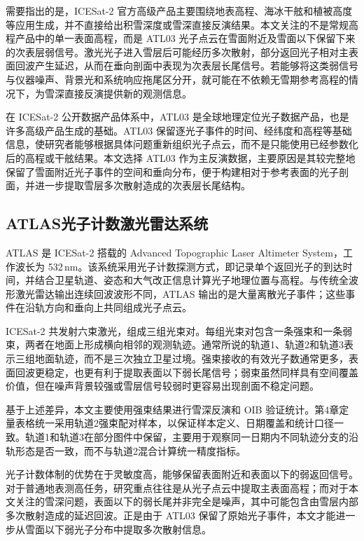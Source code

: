 需要指出的是，ICESat-2 官方高级产品主要围绕地表高程、海冰干舷和植被高度等应用生成，并不直接给出积雪深度或雪深直接反演结果。本文关注的不是常规高程产品中的单一表面高程，而是 ATL03 光子点云在雪面附近及雪面以下保留下来的次表层弱信号。激光光子进入雪层后可能经历多次散射，部分返回光子相对主表面回波产生延迟，从而在垂向剖面中表现为次表层长尾信号。若能够将这类弱信号与仪器噪声、背景光和系统响应拖尾区分开，就可能在不依赖无雪期参考高程的情况下，为雪深直接反演提供新的观测信息\citep{Hu2022,Lu2022Unc}。

在 ICESat-2 公开数据产品体系中，ATL03 是全球地理定位光子数据产品，也是许多高级产品生成的基础。ATL03 保留逐光子事件的时间、经纬度和高程等基础信息，使研究者能够根据具体问题重新组织光子点云，而不是只能使用已经参数化后的高程或干舷结果。本文选择 ATL03 作为主反演数据，主要原因是其较完整地保留了雪面附近光子事件的空间和垂向分布，便于构建相对于参考表面的光子剖面，并进一步提取雪层多次散射造成的次表层长尾结构\citep{NSIDC_ATL03}。

\subsection{ATLAS光子计数激光雷达系统}
ATLAS 是 ICESat-2 搭载的 Advanced Topographic Laser Altimeter System，工作波长为 532\,nm。该系统采用光子计数探测方式，即记录单个返回光子的到达时间，并结合卫星轨道、姿态和大气改正信息计算光子地理位置与高程。与传统全波形激光雷达输出连续回波波形不同，ATLAS 输出的是大量离散光子事件；这些事件在沿轨方向和垂向上共同组成光子点云。

ICESat-2 共发射六束激光，组成三组光束对。每组光束对包含一条强束和一条弱束，两者在地面上形成横向相邻的观测轨迹。通常所说的轨道1、轨道2和轨道3表示三组地面轨迹，而不是三次独立卫星过境。强束接收的有效光子数通常更多，表面回波更稳定，也更有利于提取表面以下弱长尾信号；弱束虽然同样具有空间覆盖价值，但在噪声背景较强或雪层信号较弱时更容易出现剖面不稳定问题。

基于上述差异，本文主要使用强束结果进行雪深反演和 OIB 验证统计。第4章定量表格统一采用轨道2强束配对样本，以保证样本定义、日期覆盖和统计口径一致。轨道1和轨道3在部分图件中保留，主要用于观察同一日期内不同轨迹分支的沿轨形态是否一致，而不与轨道2混合计算统一精度指标。

光子计数体制的优势在于灵敏度高，能够保留表面附近和表面以下的弱返回信号。对于普通地表测高任务，研究重点往往是从光子点云中提取主表面高程；而对于本文关注的雪深问题，表面以下的弱长尾并非完全是噪声，其中可能包含由雪层内部多次散射造成的延迟回波。正是由于 ATL03 保留了原始光子事件，本文才能进一步从雪面以下弱光子分布中提取多次散射信息。

